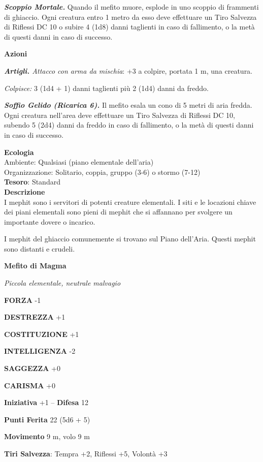 \begin{multicols}{2}
\textit{\textbf{Scoppio Mortale.}} Quando il mefito muore, esplode in uno scoppio di frammenti di ghiaccio. Ogni creatura entro 1 metro da esso deve effettuare un Tiro Salvezza di Riflessi DC 10 o subire 4 (1d8) danni taglienti in caso di fallimento, o la metà di questi danni in caso
di successo.

\textbf{Azioni}

\textit{\textbf{Artigli.} Attacco con arma da mischia}: +3 a colpire, portata 1 m, una creatura.

\textit{Colpisce:} 3 (1d4 + 1) danni taglienti più 2 (1d4) danni da freddo.

\textit{\textbf{Soffio Gelido (Ricarica 6).}} Il mefito esala un cono di 5 metri di aria fredda. Ogni creatura nell'area deve effettuare un Tiro Salvezza di Riflessi DC 10, subendo 5 (2d4) danni da freddo in caso di fallimento, o la metà di questi danni in caso di successo.

\textbf{Ecologia}\\
Ambiente: Qualsiasi (piano elementale dell'aria)\\
Organizzazione: Solitario, coppia, gruppo (3-6) o stormo (7-12)\\
\textbf{Tesoro}: Standard\\
\textbf{Descrizione}\\
I mephit sono i servitori di potenti creature elementali. I siti e le locazioni chiave dei piani elementali sono pieni di mephit che si affannano per svolgere un importante dovere o incarico.

I mephit del ghiaccio comunemente si trovano sul Piano dell'Aria. Questi mephit sono distanti e crudeli.


\medskip{}\textbf{Mefito di Magma}

\textit{Piccola elementale, neutrale malvagio}

\textbf{FORZA} -1

\textbf{DESTREZZA} +1

\textbf{COSTITUZIONE} +1

\textbf{INTELLIGENZA} -2

\textbf{SAGGEZZA} +0

\textbf{CARISMA} +0

\textbf{Iniziativa} +1 -- \textbf{Difesa} 12

\textbf{Punti Ferita} 22 (5d6 + 5)

\textbf{Movimento} 9 m, volo 9 m

\textbf{Tiri Salvezza}: Tempra +2, Riflessi +5, Volontà +3


\end{multicols}
